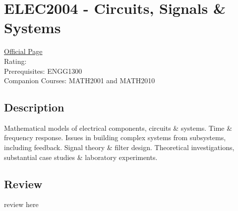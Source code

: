\hypertarget{ELEC2004}{\section{ELEC2004 - Circuits, Signals \& Systems}}

\large
\textcolor{turbo_purple}{\href{https://my.uq.edu.au/programs-courses/course.html?course_code=ELEC2004}{Official Page}} \\
Rating: \cstar\cstar\cstar\cstar\ostar \\
Prerequisites: ENGG1300 \\
Companion Courses: MATH2001 and MATH2010 \\

\normalsize
\subsection*{Description}
Mathematical models of electrical components, circuits \& systems.
Time \& frequency response. Issues in building complex systems from subsystems, including feedback.
Signal theory \& filter design.
Theoretical investigations, substantial case studies \& laboratory experiments.

\subsection*{Review}
review here
